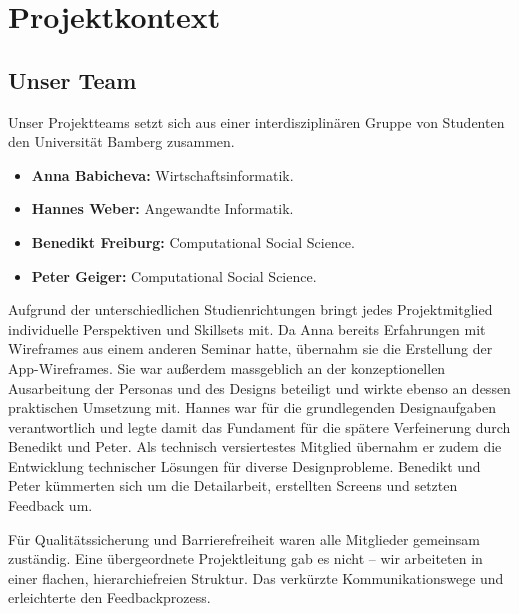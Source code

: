 \section{Projektkontext}
\subsection{Unser Team}
Unser Projektteams setzt sich aus einer interdisziplinären Gruppe von Studenten den Universität Bamberg zusammen.

\begin{itemize}
	\item \textbf{Anna Babicheva:} Wirtschaftsinformatik.
	\item \textbf{Hannes Weber:} Angewandte Informatik.
	\item \textbf{Benedikt Freiburg:} Computational Social Science.
	\item \textbf{Peter Geiger:} Computational Social Science.
\end{itemize}

Aufgrund der unterschiedlichen Studienrichtungen bringt jedes Projektmitglied individuelle Perspektiven und Skillsets mit. Da Anna bereits Erfahrungen mit Wireframes aus einem anderen Seminar hatte, übernahm sie die Erstellung der App-Wireframes. Sie war außerdem massgeblich an der konzeptionellen Ausarbeitung der Personas und des Designs beteiligt und wirkte ebenso an dessen praktischen Umsetzung mit. Hannes war für die grundlegenden Designaufgaben verantwortlich und legte damit das Fundament für die spätere Verfeinerung durch Benedikt und Peter. Als technisch versiertestes Mitglied übernahm er zudem die Entwicklung technischer Lösungen für diverse Designprobleme. Benedikt und Peter kümmerten sich um die Detailarbeit, erstellten Screens und setzten Feedback um. 

Für Qualitätssicherung und Barrierefreiheit waren alle Mitglieder gemeinsam zuständig. Eine übergeordnete Projektleitung gab es nicht – wir arbeiteten in einer flachen, hierarchiefreien Struktur. Das verkürzte Kommunikationswege und erleichterte den Feedbackprozess.

